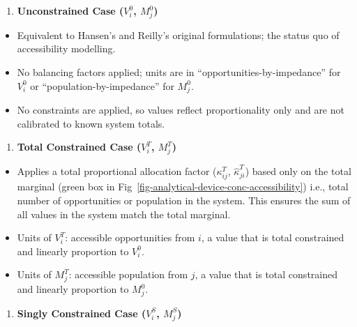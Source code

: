\documentclass[
  10pt,
  letterpaper,
]{article}
\providecommand{\tightlist}{%
  \setlength{\itemsep}{0pt}\setlength{\parskip}{0pt}}
\begin{document}
\begin{enumerate}
\def\labelenumi{\arabic{enumi}.}
\tightlist
\item
  \textbf{Unconstrained Case (\(V_i^0\), \(M_j^0\))}
\end{enumerate}

\begin{itemize}
\tightlist
\item
  Equivalent to Hansen's \citep{hansen1959} and Reilly's
  \citep{reilly1929methods} original formulations; the status quo of
  accessibility modelling.
\item
  No balancing factors applied; units are in
  ``opportunities-by-impedance'' for \(V_i^0\) or
  ``population-by-impedance'' for \(M_j^0\).
\item
  No constraints are applied, so values reflect proportionality only and
  are not calibrated to known system totals.
\end{itemize}

\begin{enumerate}
\def\labelenumi{\arabic{enumi}.}
\setcounter{enumi}{1}
\tightlist
\item
  \textbf{Total Constrained Case (\(V_i^T\), \(M_j^T\))}
\end{enumerate}

\begin{itemize}
\tightlist
\item
  Applies a total proportional allocation factor (\(\kappa_{ij}^T\),
  \(\hat \kappa_{ji}^T\)) based only on the total marginal (green box in
  Fig~\ref{fig-analytical-device-conc-accessibility}) i.e., total number
  of opportunities or population in the system. This ensures the sum of
  all values in the system match the total marginal.
\item
  Units of \(V_i^T\): accessible opportunities from \(i\), a value that
  is total constrained and linearly proportion to \(V_i^0\).
\item
  Units of \(M_j^T\): accessible population from \(j\), a value that is
  total constrained and linearly proportion to \(M_j^0\).
\end{itemize}

\begin{enumerate}
\def\labelenumi{\arabic{enumi}.}
\setcounter{enumi}{2}
\tightlist
\item
  \textbf{Singly Constrained Case (\(V_i^S\), \(M_j^S\))}
\end{enumerate}
\end{document}
